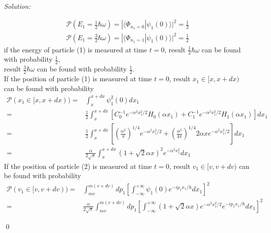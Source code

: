 \documentclass[12pt,a4paper]{article}
\newenvironment{sol}
    {\emph{Solution:}
    }
    {
    \qed
    }
\begin{document}
\begin{sol}
\begin{itemize}
\begin{gather}
\mathcal{P}(E_1=\frac{1}{2}\hbar\omega)=|\langle\Phi_{n_1=0}|\psi_1(0)\rangle|^2=\frac{1}{2}\\
\mathcal{P}(E_1=\frac{3}{2}\hbar\omega)=|\langle\Phi_{n_1=1}|\psi_1(0)\rangle|^2=\frac{1}{2}
\end{gather}
if the energy of particle (1) is measured at time $t=0$, result $\frac{1}{2}\hbar\omega$ can be found with probability $\frac{1}{2}$,\\
result $\frac{3}{2}\hbar\omega$ can be found with probability $\frac{1}{2}$.\\
If the position of particle (1) is measured at time $t=0$, result $x_1\in[x,x+dx)$ can be found with probability
\begin{align}
\nonumber\mathcal{P}(x_1\in[x,x+dx))=&\int_x^{x+dx}\psi_1^2(0)dx_1\\
\nonumber=&\frac{1}{2}\int_x^{x+dx}[C_0^{-1}e^{-\alpha^2x_1^2/2}H_0(\alpha x_1)+C_1^{-1}e^{-\alpha^2x_1^2/2}H_1(\alpha x_1)]dx_1\\
\nonumber=&\frac{1}{2}\int_x^{x+dx}\left[\left(\frac{\alpha^2}{\pi}\right)^{1/4}e^{-\alpha^2x_1^2/2}+\left(\frac{\alpha^2}{4\pi}\right)^{1/4}2\alpha xe^{-\alpha^2x_1^2/2}\right]dx_1\\
=&\frac{\alpha}{2\sqrt{\pi}}\int_x^{x+dx}(1+\sqrt{2}\alpha x)^2e^{-\alpha^2x_1^2}dx_1
\end{align}
If the position of particle (2) is measured at time $t=0$, result $v_1\in[v,v+dv)$ can be found with probability
\begin{align}
\nonumber\mathcal{P}(v_1\in[v,v+dv))=&\int_{mv}^{m(v+dv)}dp_1\left[\int_{-\infty}^{+\infty}\psi_1(0)e^{-ip_1x_1/\hbar}dx_1\right]^2\\
=&\frac{\alpha}{2\sqrt{\pi}}\int_{mv}^{m(v+dv)}dp_1\left[\int_{-\infty}^{+\infty}(1+\sqrt{2}\alpha x)e^{-\alpha^2x_1^2/2}e^{-ip_1x_1/\hbar}dx_1\right]^2
\end{align}
\end{itemize}
\end{sol}
\end{document}
